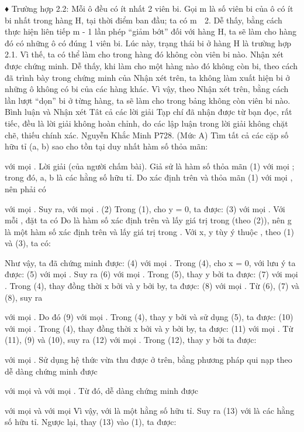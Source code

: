 \begin{multicols}{2}
{	♦ Trường hợp 2.2: Mỗi ô đều có ít nhất 2 viên bi.
	Gọi m là số viên bi của ô có ít bi nhất trong hàng H, tại thời điểm ban đầu; ta có m  2.
	Dễ thấy, bằng cách thực hiện liên tiếp m - 1 lần phép “giảm bớt” đối với hàng H, ta sẽ làm cho hàng đó có những ô có đúng 1 viên bi. Lúc này, trạng thái bi ở hàng H là trường hợp 2.1. Vì thế, ta có thể làm cho trong hàng đó không còn viên bi nào.
	Nhận xét được chứng minh.
	Dễ thấy, khi làm cho một hàng nào đó không còn bi, theo cách đã trình bày trong chứng minh của Nhận xét trên, ta không làm xuất hiện bi ở những ô không có bi của các hàng khác. Vì vậy, theo Nhận xét trên, bằng cách lần lượt “dọn” bi ở từng hàng, ta sẽ làm cho trong bảng không còn viên bi nào.
	Bình luận và Nhận xét
	Tât cả các lời giải Tạp chí đã nhận được từ bạn đọc, rất tiếc, đều là lời giải không hoàn chỉnh, do các lập luận trong lời giải không chặt chẽ, thiếu chính xác.
	Nguyễn Khắc Minh
	P728. (Mức A) Tìm tất cả các cặp số hữu tỉ (a, b) sao cho tồn tại duy nhất hàm số   thỏa mãn:
	
	với mọi  .
	Lời giải (của người chấm bài).
	Giả sử   là hàm số thỏa mãn
	(1)
	với mọi  ; trong đó, a, b là các hằng số hữu tỉ.
	Do   xác định trên   và thỏa mãn (1) với mọi  , nên phải có
	
	với mọi  .
	Suy ra,   với mọi  .                                                                                                        (2)
	Trong (1), cho y = 0, ta được:
	(3)
	với mọi  .
	Với mỗi  , đặt   ta có  
	Do   là hàm số xác định trên   và lấy giá trị trong   (theo (2)), nên g là một hàm số xác định trên   và lấy giá trị trong  .
	Với x, y tùy ý thuộc  , theo (1) và (3), ta có:
	
	Như vậy, ta đã chứng minh được:
	(4)
	với mọi  .
	Trong (4), cho x = 0, với lưu ý   ta được:
	(5)
	với mọi  . Suy ra
	(6)
	với mọi  .
	Trong (5), thay y bởi   ta được:
	(7)
	với mọi  .
	Trong (4), thay đồng thời x bởi   và y bởi by, ta được:
	(8)
	với mọi  .
	Từ (6), (7) và (8), suy ra
	
	với mọi  .
	Do đó
	(9)
	với mọi  .
	Trong (4), thay y bởi   và sử dụng (5), ta được:
	(10)
	với mọi  .
	Trong (4), thay đồng thời x bởi   và y bởi by, ta được:
	(11)
	với mọi  .
	Từ (11), (9) và (10), suy ra
	(12)
	với mọi  .
	Trong (12), thay y bởi   ta được:
	
	với mọi  .
	Sử dụng hệ thức vừa thu được ở trên, bằng phương pháp qui nạp theo   dễ dàng chứng minh được
	
	với mọi   và với mọi  .
	Từ đó, dễ dàng chứng minh được
	
	với mọi   và với mọi  
	Vì vậy,   với   là một hằng số hữu tỉ.
	Suy ra
	(13)              
	với   là các hằng số hữu tỉ.
	Ngược lại, thay (13) vào (1), ta được:
	
}
\end{multicols}

